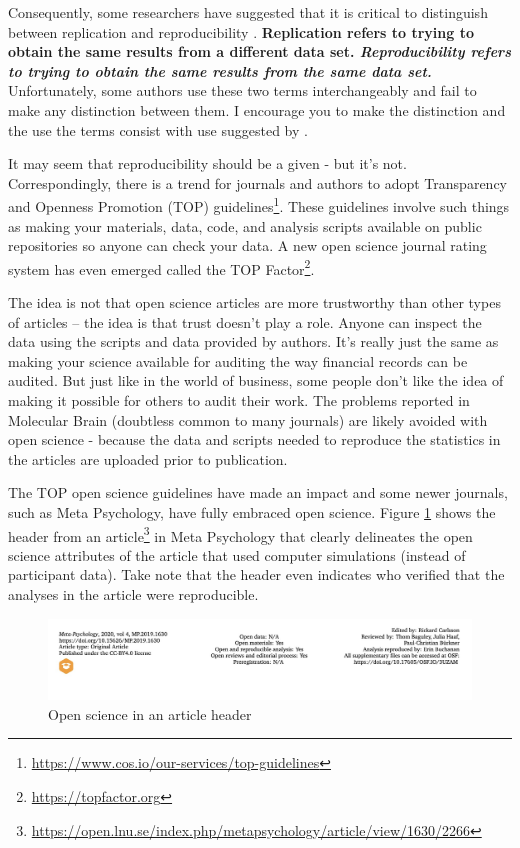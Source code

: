 \documentclass[
]{krantz}
\renewcommand{\href}[2]{#2\footnote{\url{#1}}}
\begin{document}
Consequently, some researchers have suggested that it is critical to distinguish between replication and reproducibility \citep{patil2019}. \textbf{Replication refers to trying to obtain the same results from a different data set. \emph{Reproducibility refers to trying to obtain the same results from the same data set.} } Unfortunately, some authors use these two terms interchangeably and fail to make any distinction between them. I encourage you to make the distinction and the use the terms consist with use suggested by \citep{patil2019}.

It may seem that reproducibility should be a given - but it's not. Correspondingly, there is a trend for journals and authors to adopt Transparency and Openness Promotion (TOP) \href{https://www.cos.io/our-services/top-guidelines}{guidelines}. These guidelines involve such things as making your materials, data, code, and analysis scripts available on public repositories so anyone can check your data. A new open science journal rating system has even emerged called the \href{https://topfactor.org}{TOP Factor}.

The idea is not that open science articles are more trustworthy than other types of articles -- the idea is that trust doesn't play a role. Anyone can inspect the data using the scripts and data provided by authors. It's really just the same as making your science available for auditing the way financial records can be audited. But just like in the world of business, some people don't like the idea of making it possible for others to audit their work. The problems reported in Molecular Brain (doubtless common to many journals) are likely avoided with open science - because the data and scripts needed to reproduce the statistics in the articles are uploaded prior to publication.

The TOP open science guidelines have made an impact and some newer journals, such as Meta Psychology, have fully embraced open science. Figure \ref{fig:metapsychology} shows the header from an \href{https://open.lnu.se/index.php/metapsychology/article/view/1630/2266}{article} in Meta Psychology that clearly delineates the open science attributes of the article that used computer simulations (instead of participant data). Take note that the header even indicates who verified that the analyses in the article were reproducible.

\begin{figure}
\includegraphics[width=1\linewidth]{ch_enter_load/images/screenshot_metapsychology} \caption{Open science in an article header}\label{fig:metapsychology}
\end{figure}
\end{document}
